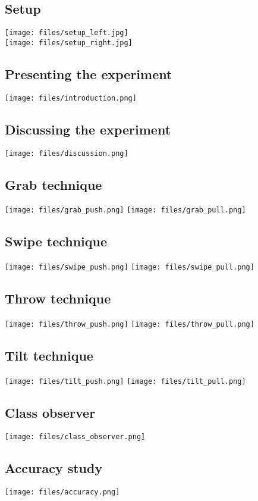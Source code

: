 \subsection*{\pictures}

\subsection*{Setup}
\texttt{[image: files/setup\_left.jpg]}
\\ \vspace{1cm}
\texttt{[image: files/setup\_right.jpg]}

\subsection*{Presenting the experiment}
\texttt{[image: files/introduction.png]}

\subsection*{Discussing the experiment}
\texttt{[image: files/discussion.png]}

\subsection*{Grab technique}
\texttt{[image: files/grab\_push.png]}
\texttt{[image: files/grab\_pull.png]}

\subsection*{Swipe technique}
\texttt{[image: files/swipe\_push.png]}
\texttt{[image: files/swipe\_pull.png]}

\subsection*{Throw technique}
\texttt{[image: files/throw\_push.png]}
\texttt{[image: files/throw\_pull.png]}

\subsection*{Tilt technique}
\texttt{[image: files/tilt\_push.png]}
\texttt{[image: files/tilt\_pull.png]}

\subsection*{Class observer}
\texttt{[image: files/class\_observer.png]}

\subsection*{Accuracy study}
\texttt{[image: files/accuracy.png]}

\addbackpage